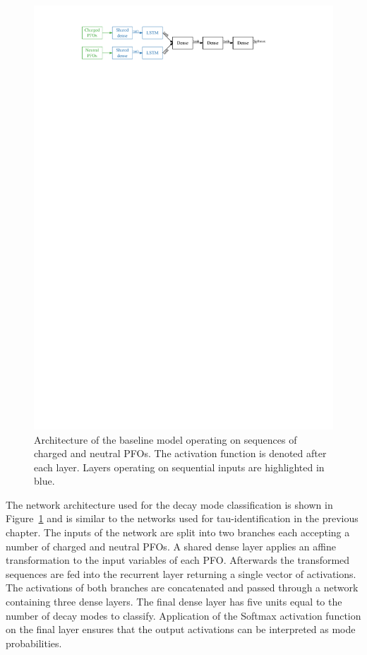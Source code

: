 \begin{figure}[htb]
  \centering
  \includegraphics{./figures/decay_mode_classification/baseline_architecture.pdf}
  \caption{Architecture of the baseline model operating on sequences of charged
    and neutral PFOs. The activation function is denoted after each layer.
    Layers operating on sequential inputs are highlighted in blue.}
  \label{fig:pfo_rnn_baseline_arch}
\end{figure}

The network architecture used for the decay mode classification is shown in
Figure~\ref{fig:pfo_rnn_baseline_arch} and is similar to the networks used for
tau-identification in the previous chapter. The inputs of the network are split
into two branches each accepting a number of charged and neutral PFOs. A shared
dense layer applies an affine transformation to the input variables of each PFO.
Afterwards the transformed sequences are fed into the recurrent layer returning
a single vector of activations. The activations of both branches are
concatenated and passed through a network containing three dense layers. The
final dense layer has five units equal to the number of decay modes to classify.
Application of the Softmax activation function on the final layer ensures that
the output activations can be interpreted as mode probabilities.

